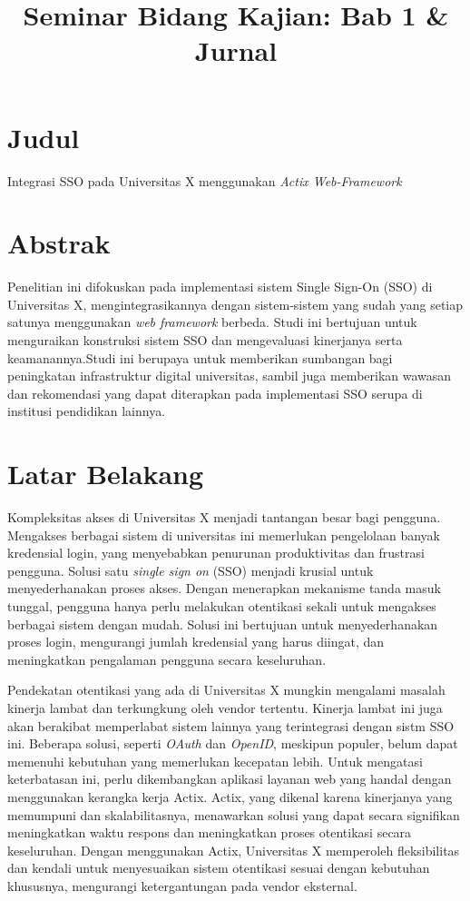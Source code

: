 \documentclass{article}
\title{Seminar Bidang Kajian: Bab 1 & Jurnal }
\begin{document}
\section*{Judul}
Integrasi SSO pada Universitas X menggunakan \emph{Actix Web-Framework}
\section{Abstrak}
Penelitian ini difokuskan pada implementasi sistem Single Sign-On (SSO) di Universitas X, mengintegrasikannya dengan sistem-sistem yang sudah yang setiap satunya menggunakan \emph{web framework} berbeda. Studi ini bertujuan untuk menguraikan konstruksi sistem SSO dan mengevaluasi kinerjanya serta keamanannya.Studi ini berupaya untuk memberikan sumbangan bagi peningkatan infrastruktur digital universitas, sambil juga memberikan wawasan dan rekomendasi yang dapat diterapkan pada implementasi SSO serupa di institusi pendidikan lainnya.

\section{Latar Belakang}

Kompleksitas akses di Universitas X menjadi tantangan besar bagi pengguna. Mengakses berbagai sistem di universitas ini memerlukan pengelolaan banyak kredensial login, yang menyebabkan penurunan produktivitas dan frustrasi pengguna. Solusi satu \emph{single sign on} (SSO) menjadi krusial untuk menyederhanakan proses akses. Dengan menerapkan mekanisme tanda masuk tunggal, pengguna hanya perlu melakukan otentikasi sekali untuk mengakses berbagai sistem dengan mudah. Solusi ini bertujuan untuk menyederhanakan proses login, mengurangi jumlah kredensial yang harus diingat, dan meningkatkan pengalaman pengguna secara keseluruhan.

Pendekatan otentikasi yang ada di Universitas X mungkin mengalami masalah kinerja lambat dan terkungkung oleh vendor tertentu. Kinerja lambat ini juga akan berakibat memperlabat sistem lainnya yang terintegrasi dengan  sistm SSO ini. Beberapa solusi, seperti \emph{OAuth} dan \emph{OpenID}, meskipun populer, belum dapat memenuhi kebutuhan yang memerlukan kecepatan lebih. Untuk mengatasi keterbatasan ini, perlu dikembangkan aplikasi layanan web yang handal dengan menggunakan kerangka kerja Actix. Actix, yang dikenal karena kinerjanya yang memumpuni dan skalabilitasnya, menawarkan solusi yang dapat secara signifikan meningkatkan waktu respons dan meningkatkan proses otentikasi secara keseluruhan. Dengan menggunakan Actix, Universitas X memperoleh fleksibilitas dan kendali untuk menyesuaikan sistem otentikasi sesuai dengan kebutuhan khususnya, mengurangi ketergantungan pada vendor eksternal.
\end{document}
